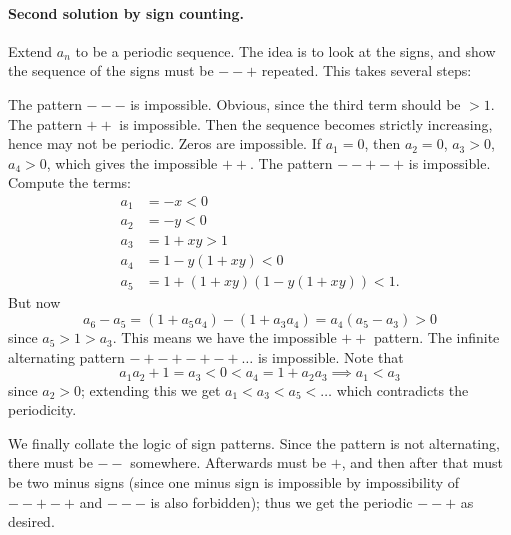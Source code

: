 \paragraph{Second solution by sign counting.}
Extend $a_n$ to be a periodic sequence.
The idea is to look at the signs, and show the sequence
of the signs must be $--+$ repeated.
This takes several steps:
\begin{itemize}
  \ii The pattern $---$ is impossible. Obvious, since the third term should be $ > 1$.
  \ii The pattern $++$ is impossible. Then the sequence becomes strictly increasing,
  hence may not be periodic.
  \ii Zeros are impossible. If $a_1 = 0$, then $a_2 = 0$, $a_3 > 0$, $a_4 > 0$,
  which gives the impossible $++$.
  \ii The pattern $--+-+$ is impossible.
  Compute the terms:
  \begin{align*}
    a_1 &= -x < 0 \\
    a_2 &= -y < 0 \\
    a_3 &= 1 + xy > 1 \\
    a_4 &= 1 - y(1+xy) < 0 \\
    a_5 &= 1 + (1+xy)(1-y(1+xy)) < 1.
  \end{align*}
  But now
  \[ a_6 - a_5 = (1 + a_5 a_4) - (1 + a_3 a_4)
    = a_4 (a_5 - a_3) > 0 \]
  since $a_5 > 1 > a_3$.
  This means we have the impossible $++$ pattern.
  \ii The infinite alternating pattern $-+-+-+-+\dots$ is impossible.
  Note that
  \[ a_1 a_2 + 1 = a_3 < 0 < a_4 = 1 + a_2 a_3 \implies a_1 < a_3 \]
  since $a_2 > 0$;
  extending this we get $a_1 < a_3 < a_5 < \dots$
  which contradicts the periodicity.
\end{itemize}
We finally collate the logic of sign patterns.
Since the pattern is not alternating, there must be $--$ somewhere.
Afterwards must be $+$, and then after that must be two minus signs
(since one minus sign is impossible by impossibility of $--+-+$
and $---$ is also forbidden);
thus we get the periodic $--+$ as desired.
